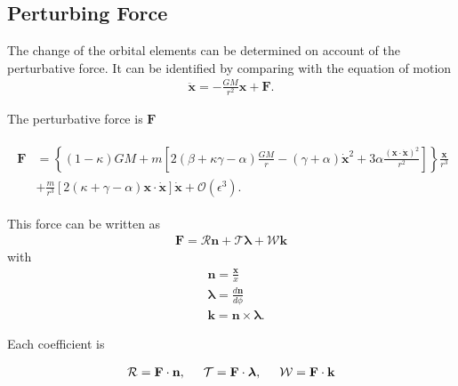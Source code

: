 \subsection{Perturbing Force}

The change of the orbital elements can be determined on account of the perturbative force. It can be identified by comparing with the equation of motion
\begin{align*}
    \mathbf{\ddot{x}}= -\frac{GM}{r^2}\mathbf{x}+\mathbf{F}.
\end{align*}

The perturbative force is $\mathbf{F}$

\begin{align}
\begin{split}
\label{eq: equationofmotion}
\mathbf{F} &=\left\{(1-\kappa) GM+ m\left[2(\beta + \kappa \gamma - \alpha)\frac{GM}{r}-(\gamma+\alpha)\mathbf{\dot{x}}^2+ 3\alpha\frac{\left(\mathbf{x} \cdot \mathbf{\dot{x}}\right)^2}{r^2}\right]\right\}\frac{\mathbf{x}}{r^3}\\
&+\frac{m}{r^3}\left[2(\kappa+\gamma - \alpha)\mathbf{x}\cdot\mathbf{\dot{x}}\right]\mathbf{\dot{x}}+\mathcal{O}(\epsilon^3).
\end{split}
\end{align}

This force can be written as
\begin{align}
\mathbf{F} = \mathcal{R} \mathbf{n}+\mathcal{T}\boldsymbol{\lambda}+\mathcal{W}\mathbf{k}
\end{align}
with
\begin{subequations}
\begin{align}
&\mathbf{n} = \frac{\mathbf{x}}{x}\\
&\boldsymbol{\lambda}  = \frac{d\mathbf{n} }{d\phi} \\
&\mathbf{k}  = \mathbf{n} \times \boldsymbol{\lambda}.
\end{align}
\end{subequations}

Each coefficient is

\begin{align}\label{eq: componetsperturbingforce}
\mathcal{R} = \mathbf{F} \cdot \mathbf{n}, \hspace{0.5cm} \mathcal{T} = \mathbf{F} \cdot \boldsymbol{\lambda}, \hspace{0.5cm}
\mathcal{W} = \mathbf{F} \cdot \mathbf{k}
\end{align}

